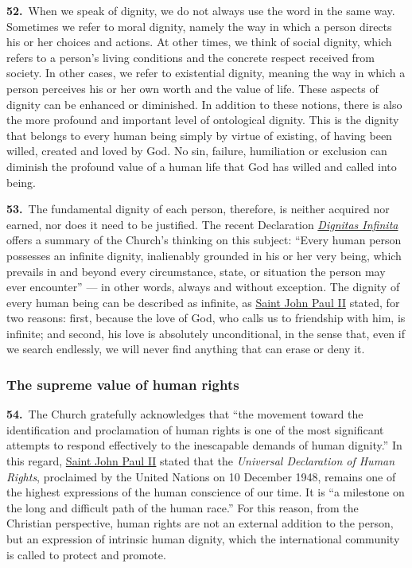 \documentclass{article}
\begin{document}
\textbf{52.}\ When we speak of dignity, we do not always use the word in the same way. Sometimes we refer to moral dignity, namely the way in which a person directs his or her choices and actions. At other times, we think of social dignity, which refers to a person's living conditions and the concrete respect received from society. In other cases, we refer to existential dignity, meaning the way in which a person perceives his or her own worth and the value of life. These aspects of dignity can be enhanced or diminished. In addition to these notions, there is also the more profound and important level of ontological dignity. This is the dignity that belongs to every human being simply by virtue of existing, of having been willed, created and loved by God.\cite{n60} No sin, failure, humiliation or exclusion can diminish the profound value of a human life that God has willed and called into being.\cite{n61}

\textbf{53.}\ The fundamental dignity of each person, therefore, is neither acquired nor earned, nor does it need to be justified. The recent Declaration \href{https://www.vatican.va/roman_curia/congregations/cfaith/documents/rc_ddf_doc_20240402_dignitas-infinita_en.html}{\emph{Dignitas Infinita}} offers a summary of the Church's thinking on this subject: ``Every human person possesses an infinite dignity, inalienably grounded in his or her very being, which prevails in and beyond every circumstance, state, or situation the person may ever encounter''\cite{n62} --- in other words, always and without exception. The dignity of every human being can be described as infinite, as \href{https://www.vatican.va/content/john-paul-ii/en.html}{Saint John Paul II} stated,\cite{n63} for two reasons: first, because the love of God, who calls us to friendship with him, is infinite; and second, his love is absolutely unconditional, in the sense that, even if we search endlessly, we will never find anything that can erase or deny it.

\subsubsection{The supreme value of human rights}

\textbf{54.}\ The Church gratefully acknowledges that ``the movement toward the identification and proclamation of human rights is one of the most significant attempts to respond effectively to the inescapable demands of human dignity.''\cite{n64} In this regard, \href{https://www.vatican.va/content/john-paul-ii/en.html}{Saint John Paul II} stated that the \emph{Universal Declaration of Human Rights}, proclaimed by the United Nations on 10 December 1948, remains one of the highest expressions of the human conscience of our time.\cite{n65} It is ``a milestone on the long and difficult path of the human race.''\cite{n66} For this reason, from the Christian perspective, human rights are not an external addition to the person, but an expression of intrinsic human dignity, which the international community is called to protect and promote.
\end{document}
